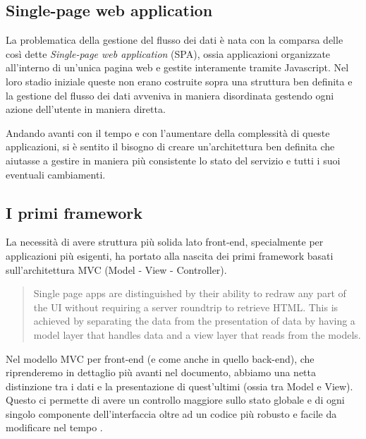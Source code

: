 \subsection{Single-page web application}
La problematica della gestione del flusso dei dati è nata con la comparsa delle così dette \textit{Single-page web application} (SPA), ossia applicazioni organizzate all'interno di un'unica pagina web e gestite interamente tramite Javascript.
Nel loro stadio iniziale queste non erano costruite sopra una struttura ben definita e la gestione del flusso dei dati avveniva in maniera disordinata gestendo ogni azione dell'utente in maniera diretta.

Andando avanti con il tempo e con l'aumentare della complessità di queste applicazioni, si è sentito il bisogno di creare un'architettura ben definita che aiutasse a gestire in maniera più consistente lo stato del servizio e tutti i suoi eventuali cambiamenti.

\subsection{I primi framework}
La necessità di avere struttura più solida lato front-end, specialmente per applicazioni più esigenti, ha portato alla nascita dei primi framework basati sull'architettura MVC (Model - View - Controller).

\blockquote{Single page apps are distinguished by their ability to redraw any part of the UI without requiring a server roundtrip to retrieve HTML. This is achieved by separating the data from the presentation of data by having a model layer that handles data and a view layer that reads from the models. \cite{MixuSinglePageWebApp}}

\noindent Nel modello MVC per front-end (e come anche in quello back-end), che riprenderemo in dettaglio più avanti nel documento, abbiamo una netta distinzione tra i dati e la presentazione di quest'ultimi (ossia tra Model e View). Questo ci permette di avere un controllo maggiore sullo stato globale e di ogni singolo componente dell'interfaccia oltre ad un codice più robusto e facile da modificare nel tempo \cite{ParrOnTheMVC}.

